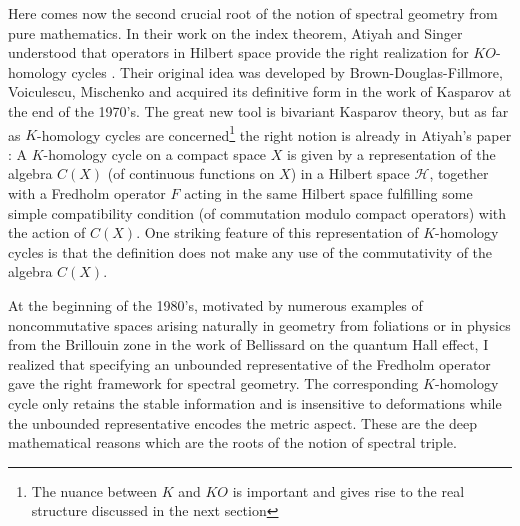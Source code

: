 \documentclass[12pt]{article}
\def\cH{{\mathcal H}}
\begin{document}
  Here comes now the second crucial root of the notion of spectral geometry from pure mathematics. In their work on the index theorem, Atiyah and Singer understood that operators in Hilbert space  provide the right realization for $KO$-homology cycles \cite{Atiyah, Singer}. Their original idea was developed by Brown-Douglas-Fillmore, Voiculescu, Mischenko and 
acquired its definitive form in the work of Kasparov at the end of the 1970's. The great new tool is  bivariant Kasparov theory, but as far as  $K$-homology cycles are concerned\footnote{The nuance between $K$ and $KO$ is important and gives rise to the real structure discussed in the next section} the right notion is already in Atiyah's paper \cite{Atiyah}: A $K$-homology cycle on a compact space $X$ is given by a representation of the algebra $C(X)$ (of continuous functions on $X$) in a Hilbert space $\cH$, together with a Fredholm operator $F$ acting in the same Hilbert space fulfilling some simple compatibility condition (of commutation modulo compact operators) with the action of $C(X)$. One striking feature of this representation of $K$-homology cycles is that the definition does not make any use of the commutativity of the algebra $C(X)$.

 At the beginning of the 1980's, motivated by numerous examples of noncommutative spaces arising naturally in geometry from foliations or in physics from the Brillouin zone in the work of Bellissard on the quantum Hall effect, I realized that specifying an unbounded representative of the Fredholm operator gave the right framework for spectral geometry. The corresponding $K$-homology cycle only retains the stable information and is insensitive  to deformations while the unbounded representative encodes the metric aspect. These are the deep mathematical reasons which are the roots of the notion of spectral triple. 
\end{document}
